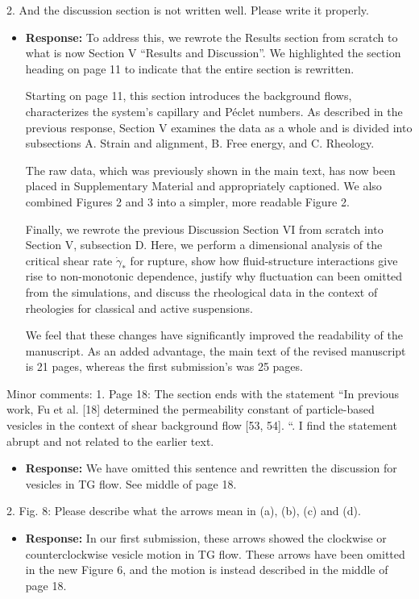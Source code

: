 \documentclass[11pt]{article}
\newcommand{\comment}[1]{{\color{blue} #1}}
\begin{document}
\noindent
\comment{2. And the discussion section is not written well. Please write it
properly.}
    \begin{itemize}
    \item[] {\bf Response:}
      To address this,
      we rewrote the Results section from scratch
    to what is now Section V ``Results and Discussion''.
    We highlighted the section heading on page 11 to indicate
    that the entire section is rewritten.

    Starting on page 11, this section introduces the background flows,
    characterizes the system's capillary and P\'eclet numbers.
    As described in the previous response, Section V examines the data
    as a whole and is divided into subsections A. Strain and alignment,
    B. Free energy, and C. Rheology.

    The raw data, which was previously shown in the
    main text, has now been placed in Supplementary Material
    and appropriately captioned.  We also combined
    Figures 2 and 3 into a simpler, more readable Figure 2.    

    Finally, we rewrote the previous Discussion Section VI from scratch
    into Section V, subsection D. Here,
    we perform a dimensional analysis of the critical shear rate $\dot \gamma_*$
    for rupture, show how fluid-structure interactions
    give rise to non-monotonic dependence, justify why
    fluctuation can been omitted from the simulations, and
    discuss the rheological data in the context of 
    rheologies for classical and active suspensions.

    We feel that these changes have significantly improved the readability
    of the manuscript.  As an added advantage, the main text of the
    revised manuscript is 21 pages, whereas the first submission's was
    25 pages.  
    \end{itemize}

\noindent
\comment{Minor comments: 1. Page 18: The section ends with 
the statement “In previous work, Fu
et al. [18] determined the permeability constant of particle-based
vesicles in the context of shear background flow [53, 54]. “. I find
the statement abrupt and not related to the earlier text.}

\begin{itemize}
  \item[] {\bf Response:}
    We have omitted this sentence and rewritten the discussion
    for vesicles in TG flow.  See middle of page 18.   
\end{itemize}

\noindent
\comment{2. Fig. 8: Please describe what the arrows mean in (a), (b), (c) and
(d).}

\begin{itemize}
\item[] {\bf Response:}
  In our first submission, these arrows showed the clockwise or counterclockwise
  vesicle motion in TG flow.  These arrows have been omitted in the new Figure 6,
  and the motion is instead described in the middle of page 18. 
\end{itemize}
\end{document}
